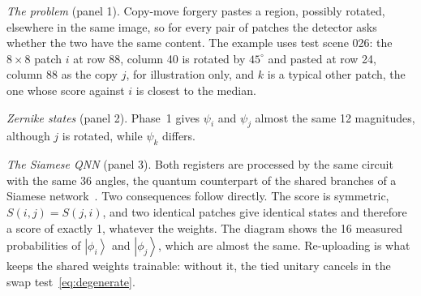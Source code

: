 \documentclass[conference]{IEEEtran}
\newcommand{\ket}[1]{\left|#1\right\rangle}
\begin{document}
\emph{The problem} (panel 1). Copy-move forgery pastes a region, possibly rotated, elsewhere in the same image, so for every pair of patches the detector asks whether the two have the same content. The example uses test scene 026: the $8\times8$ patch $i$ at row 88, column 40 is rotated by $45^\circ$ and pasted at row 24, column 88 as the copy $j$, for illustration only, and $k$ is a typical other patch, the one whose score against $i$ is closest to the median.

\emph{Zernike states} (panel 2). Phase~1 gives $\psi_i$ and $\psi_j$ almost the same 12 magnitudes, although $j$ is rotated, while $\psi_k$ differs.

\emph{The Siamese QNN} (panel 3). Both registers are processed by the same circuit with the same 36 angles, the quantum counterpart of the shared branches of a Siamese network~\cite{siamese1993}. Two consequences follow directly. The score is symmetric, $S(i,j) = S(j,i)$, and two identical patches give identical states and therefore a score of exactly 1, whatever the weights. The diagram shows the 16 measured probabilities of $\ket{\phi_i}$ and $\ket{\phi_j}$, which are almost the same. Re-uploading is what keeps the shared weights trainable: without it, the tied unitary cancels in the swap test~\eqref{eq:degenerate}.
\end{document}
